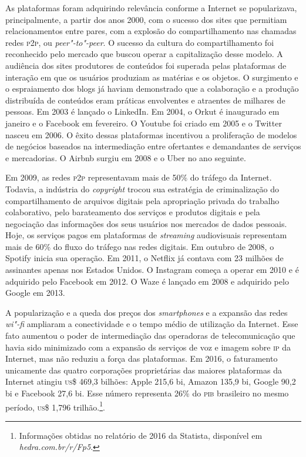 As plataformas foram adquirindo relevância conforme a Internet se
popularizava, principalmente, a partir dos anos 2000, com o sucesso dos
sites que permitiam relacionamentos entre pares, com a explosão do
compartilhamento nas chamadas redes \textsc{p2p}, ou \textit{peer"-to"-peer}. O sucesso da
cultura do compartilhamento foi reconhecido pelo mercado que buscou
operar a capitalização desse modelo. A audiência dos sites produtores de
conteúdos foi superada pelas plataformas de interação em que os usuários
produziam as matérias e os objetos. O surgimento e o espraiamento dos
blogs já haviam demonstrado que a colaboração e a produção distribuída
de conteúdos eram práticas envolventes e atraentes de milhares de
pessoas. Em 2003 é lançado o LinkedIn. Em 2004, o Orkut é inaugurado em
janeiro e o Facebook em fevereiro. O Youtube foi criado em 2005 e o
Twitter nasceu em 2006. O êxito dessas plataformas incentivou a
proliferação de modelos de negócios baseados na intermediação entre
ofertantes e demandantes de serviços e mercadorias. O Airbnb surgiu em
2008 e o Uber no ano seguinte.

Em 2009, as redes \textsc{p2p} representavam mais de 50\% do tráfego da Internet.
Todavia, a indústria do \textit{copyright} trocou sua estratégia de
criminalização do compartilhamento de arquivos digitais pela apropriação
privada do trabalho colaborativo, pelo barateamento dos serviços e
produtos digitais e pela negociação das informações dos seus usuários
nos mercados de dados pessoais. Hoje, os serviços pagos em plataformas
de \textit{streaming} audiovisuais representam mais de 60\% do fluxo do tráfego
nas redes digitais. Em outubro de 2008, o Spotify inicia sua operação.
Em 2011, o Netflix já contava com 23 milhões de assinantes apenas nos
Estados Unidos. O Instagram começa a operar em 2010 e é adquirido pelo
Facebook em 2012. O Waze é lançado em 2008 e adquirido pelo Google em
2013.

\textls[-10]A popularização e a queda dos preços dos \textit{smartphones} e a expansão das redes \textit{wi"-fi} ampliaram a conectividade e o tempo médio de utilização da Internet. Esse fato aumentou o poder de intermediação das operadoras de telecomunicação que havia sido minimizado com a expansão ds serviços de voz e imagem sobre \textsc{ip} da Internet, mas não reduziu a força das plataformas. Em 2016, o faturamento unicamente das quatro corporações proprietárias das maiores plataformas da Internet atingiu \textsc{us}\$ 469,3 bilhões: Apple 215,6 bi, Amazon 135,9 bi, Google 90,2 bi e Facebook 27,6 bi. Esse número representa 26\% do \textsc{pib} brasileiro no mesmo período, \textsc{us}\$ 1,796 trilhão.\footnote{Informações obtidas no relatório de 2016 da Statista, disponível em \textit{hedra.com.br/r/Fp5}.}.

